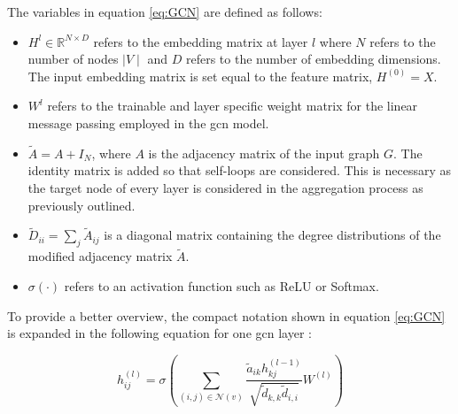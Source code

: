 	\noindent The variables in equation \ref{eq:GCN} are defined as follows:

	\begin{itemize}
		\setlength\itemsep{0.2em}
		\item $H^{l}\in\mathbb{R}^{N \times D}$ refers to the embedding matrix
			at layer $l$ where $N$ refers to the number of nodes $\mid V \mid$
			and $D$ refers to the number of embedding dimensions. The input
			embedding matrix is set equal to the feature matrix, $H^{(0)}=X$.
		\item $W^{l}$ refers to the trainable and layer specific weight matrix
			for the linear message passing employed in the \acs{gcn} model.
		\item $\tilde A = A + I_N$, where $A$ is the adjacency matrix of the
			input graph $G$. The identity matrix is added so that self-loops
			are considered. This is necessary as the target node of every layer
			is considered in the aggregation process as previously outlined.
		\item $\tilde D_{ii} = \sum_{j}\tilde A_{ij}$ is a diagonal matrix
			containing the degree distributions of the modified adjacency
			matrix $\tilde A$.
		\item $\sigma(\cdot)$ refers to an activation function such as ReLU or
			Softmax.
	\end{itemize}

	\noindent To provide a better overview, the compact notation shown in 
	equation \ref{eq:GCN} is expanded in the following equation for one
	\acs{gcn} layer \citep{Dubois2019}:

	\begin{equation}
		h_{ij}^{(l)} = \sigma\left(\sum_{(i,j)\in
		\mathcal{N}(v)}\frac{\tilde a_{ik}h_{kj}^{(l-1)}}{\sqrt{\tilde
d_{k,k}\tilde d_{i,i}}} W^{(l)}\right)
		\label{eq:GCN_expand}
	\end{equation}
	

